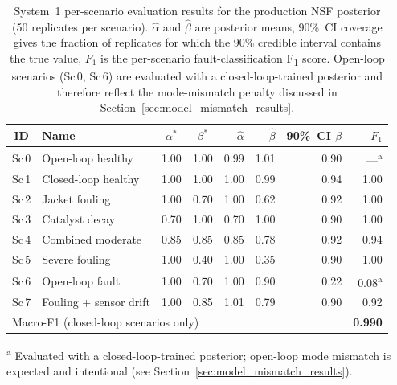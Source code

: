 \documentclass[aps,pre,twocolumn,superscriptaddress]{revtex4-2}
\begin{document}
\begin{table}[htbp]
\centering
\caption{System~1 per-scenario evaluation results for the production NSF
  posterior (50 replicates per scenario).  $\hat{\alpha}$
  and $\hat{\beta}$ are posterior means, 90\%~CI coverage gives the
  fraction of replicates for which the 90\% credible interval contains
  the true value, $F_1$ is the per-scenario fault-classification F\textsubscript{1}
  score.  Open-loop scenarios (Sc\,0, Sc\,6) are evaluated with a
  closed-loop-trained posterior and therefore reflect the mode-mismatch
  penalty discussed in Section~\ref{sec:model_mismatch_results}.}
\label{tab:scenario_results}
\small
\begin{tabular}{clccrrrr}
\toprule
ID & Name & $\alpha^*$ & $\beta^*$ &
$\hat{\alpha}$ & $\hat{\beta}$ & 90\%~CI $\beta$ & $F_1$ \\
\midrule
Sc\,0 & Open-loop healthy     & 1.00 & 1.00 & 0.99 & 1.01 & 0.90 & —\textsuperscript{a} \\
Sc\,1 & Closed-loop healthy   & 1.00 & 1.00 & 1.00 & 0.99 & 0.94 & 1.00 \\
Sc\,2 & Jacket fouling        & 1.00 & 0.70 & 1.00 & 0.62 & 0.92 & 1.00 \\
Sc\,3 & Catalyst decay        & 0.70 & 1.00 & 0.70 & 1.00 & 0.90 & 1.00 \\
Sc\,4 & Combined moderate     & 0.85 & 0.85 & 0.85 & 0.78 & 0.92 & 0.94 \\
Sc\,5 & Severe fouling        & 1.00 & 0.40 & 1.00 & 0.35 & 0.90 & 1.00 \\
Sc\,6 & Open-loop fault       & 1.00 & 0.70 & 1.00 & 0.90 & 0.22 & 0.08\textsuperscript{a} \\
Sc\,7 & Fouling + sensor drift & 1.00 & 0.85 & 1.01 & 0.79 & 0.90 & 0.92 \\
\midrule
\multicolumn{7}{l}{Macro-F1 (closed-loop scenarios only)} & \textbf{0.990} \\
\bottomrule
\end{tabular}
\begin{flushleft}
\textsuperscript{a} Evaluated with a closed-loop-trained posterior; open-loop
  mode mismatch is expected and intentional (see Section~\ref{sec:model_mismatch_results}).
\end{flushleft}
\end{table}
\end{document}
